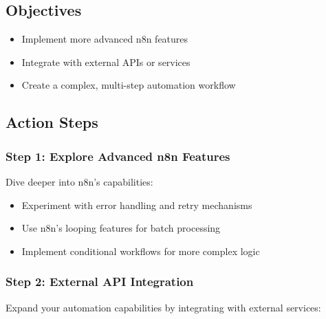 \subsection{Objectives}
\begin{itemize}
    \item Implement more advanced n8n features
    \item Integrate with external APIs or services
    \item Create a complex, multi-step automation workflow
\end{itemize}

\subsection{Action Steps}

\subsubsection{Step 1: Explore Advanced n8n Features}
Dive deeper into n8n's capabilities:

\begin{itemize}
    \item Experiment with error handling and retry mechanisms
    \item Use n8n's looping features for batch processing
    \item Implement conditional workflows for more complex logic
\end{itemize}

\subsubsection{Step 2: External API Integration}
Expand your automation capabilities by integrating with external services:


